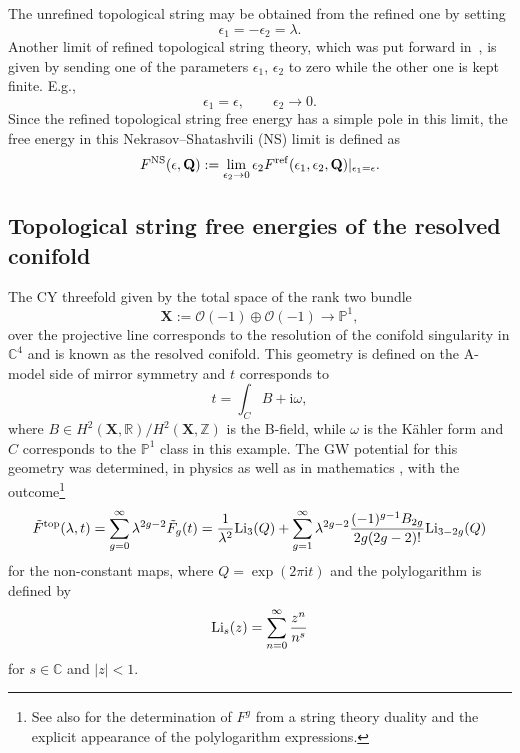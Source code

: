 \documentclass[pdftex]{sigma}
\numberwithin{equation}{section}
\begin{document}
The unrefined topological string may be obtained from the refined one by setting
\begin{equation*}
 \epsilon_1=-\epsilon_2= \lambda.
 \end{equation*}
Another limit of refined topological string theory, which was put forward in~\cite{NS}, is given by sending one of the parameters $\epsilon_1$, $\epsilon_2$ to zero while the other one is kept finite. E.g.,
\begin{equation*}
 \epsilon_1=\epsilon,\qquad \epsilon_2\rightarrow 0.
 \end{equation*}
Since the refined topological string free energy has a simple pole in this limit, the free energy in this Nekrasov--Shatashvili (NS) limit is defined as
\begin{equation*}
F^{\mathrm{NS}} (\epsilon,{\bf{Q}}) := \lim_{\epsilon_2\rightarrow 0} \epsilon_2 F^{\rm ref}(\epsilon_1,\epsilon_2,{\bf{Q}}) |_{\epsilon_1=\epsilon}.
\end{equation*}



\subsection{Topological string free energies of the resolved conifold}\label{sec:freeenergyrescon}

The CY threefold given by the total space of the rank two bundle
\begin{equation*}
\mathbf{X} := \mathcal{O}(-1) \oplus \mathcal{O}(-1) \rightarrow \mathbb{P}^1,
\end{equation*}
over the projective line
corresponds to the resolution of the conifold singularity in $\mathbb{C}^4$ and is known as the resolved conifold. This geometry is defined on the A-model side of mirror symmetry and $t$ corresponds to
\begin{equation*}
t= \int_{C} B+ \mathrm{i} \omega,
\end{equation*}
where $B\in H^{2}(\mathbf{X},\mathbb{R})/H^{2}(\mathbf{X},\mathbb{Z})$ is the B-field, while $\omega$ is the K\"ahler form and $C$ corresponds to the $\mathbb{P}^1$ class in this example. The GW potential for this geometry was determined, in physics \cite{Gopakumar:1998ii,GV} as well as in mathematics \cite{Faber}, with the outcome\footnote{See also \cite{MM} for the determination of $F^g$ from a string theory duality and the explicit appearance of the polylogarithm expressions.}
\begin{equation}\label{resconfree}
\tilde{F}^\mathrm{top}(\lambda,t)= \sum_{g=0}^{\infty} \lambda^{2g-2} \tilde{F}_g(t)= \frac{1}{\lambda^2} {\rm Li}_{3}(Q)+ \sum_{g=1}^{\infty} \lambda^{2g-2} \frac{(-1)^{g-1}B_{2g}}{2g (2g-2)!} {\rm Li}_{3-2g} (Q)
\end{equation}
for the non-constant maps, where $Q=\exp(2\pi \mathrm{i} t)$ and the polylogarithm is defined by
\begin{equation*}
{\rm Li}_s(z) = \sum_{n=0}^{\infty} \frac{z^n}{n^s}
\end{equation*}
for $s\in \mathbb{C}$ and $|z|<1$.
\end{document}
